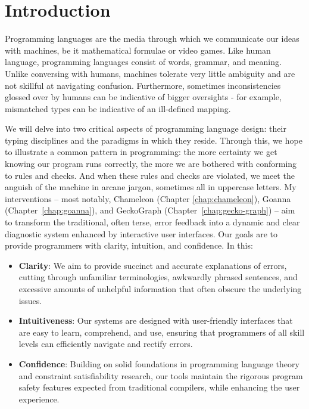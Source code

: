 
\chapter{Introduction}

\label{chap:introduction} 

\graphicspath{{Figures/Introduction}}

Programming languages are the media through which we communicate our ideas with machines, be it mathematical formulae or video games. Like human language, programming languages consist of words, grammar, and meaning. Unlike conversing with humans, machines tolerate very little ambiguity and are not skillful at navigating confusion. Furthermore, sometimes inconsistencies glossed over by humans can be indicative of bigger oversights - for example, mismatched types can be indicative of an ill-defined mapping. 

We will delve into two critical aspects of programming language design: their typing disciplines and the paradigms in which they reside. Through this, we hope to illustrate a common pattern in programming: the more certainty we get knowing our program runs correctly, the more we are bothered with conforming to rules and checks. And when these rules and checks are violated, we meet the anguish of the machine in arcane jargon, sometimes all in uppercase letters. My interventions -- most notably, Chameleon (Chapter \ref{chap:chameleon}), Goanna (Chapter~\ref{chap:goanna}), and GeckoGraph (Chapter~\ref{chap:gecko-graph}) -- aim to transform the traditional, often terse, error feedback into a dynamic and clear diagnostic system enhanced by interactive user interfaces. Our goals are to provide programmers with clarity, intuition, and confidence. In this:

\begin{itemize}
  \item \textbf{Clarity}: We aim to provide succinct and accurate explanations of errors, cutting through unfamiliar terminologies, awkwardly phrased sentences, and excessive amounts of unhelpful information that often obscure the underlying issues.
  \item \textbf{Intuitiveness}: Our systems are designed with user-friendly interfaces that are easy to learn, comprehend, and use, ensuring that programmers of all skill levels can efficiently navigate and rectify errors.
  \item \textbf{Confidence}: Building on solid foundations in programming language theory and constraint satisfiability research, our tools maintain the rigorous program safety features expected from traditional compilers, while enhancing the user experience.
\end{itemize}

